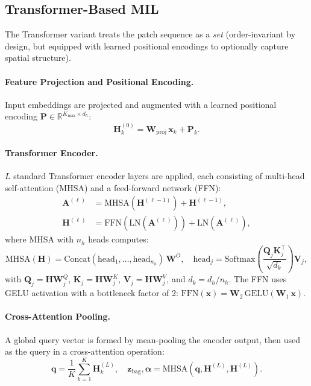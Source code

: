\documentclass[11pt,a4paper]{article}
\begin{document}
\subsection{Transformer-Based MIL}
\label{sec:transformer}

The Transformer variant treats the patch sequence as a \emph{set} (order-invariant
by design, but equipped with learned positional encodings to optionally capture
spatial structure).

\paragraph{Feature Projection and Positional Encoding.}
Input embeddings are projected and augmented with a learned positional encoding
$\mathbf{P} \in \mathbb{R}^{K_{\max} \times d_h}$:
\begin{equation}
  \mathbf{H}^{(0)}_k = \mathbf{W}_{\text{proj}}\,\mathbf{x}_k + \mathbf{P}_k.
\end{equation}

\paragraph{Transformer Encoder.}
$L$ standard Transformer encoder layers are applied, each consisting of
multi-head self-attention (MHSA) and a feed-forward network (FFN):
\begin{align}
  \mathbf{A}^{(\ell)} &= \text{MHSA}\!\left(\mathbf{H}^{(\ell-1)}\right) + \mathbf{H}^{(\ell-1)}, \\
  \mathbf{H}^{(\ell)} &= \text{FFN}\!\left(\text{LN}(\mathbf{A}^{(\ell)})\right) + \text{LN}(\mathbf{A}^{(\ell)}),
\end{align}
where MHSA with $n_h$ heads computes:
\begin{equation}
  \text{MHSA}(\mathbf{H}) = \text{Concat}(\text{head}_1, \ldots, \text{head}_{n_h})\,\mathbf{W}^O,
  \quad
  \text{head}_j = \text{Softmax}\!\left(\frac{\mathbf{Q}_j\mathbf{K}_j^\top}{\sqrt{d_k}}\right)\mathbf{V}_j,
\end{equation}
with $\mathbf{Q}_j = \mathbf{H}\mathbf{W}_j^Q$, $\mathbf{K}_j = \mathbf{H}\mathbf{W}_j^K$,
$\mathbf{V}_j = \mathbf{H}\mathbf{W}_j^V$, and $d_k = d_h / n_h$.
The FFN uses GELU activation with a bottleneck factor of 2: $\text{FFN}(\mathbf{x}) = \mathbf{W}_2\,\text{GELU}(\mathbf{W}_1\,\mathbf{x})$.

\paragraph{Cross-Attention Pooling.}
A global query vector is formed by mean-pooling the encoder output, then used as
the query in a cross-attention operation:
\begin{equation}
  \mathbf{q} = \frac{1}{K}\sum_{k=1}^{K} \mathbf{H}^{(L)}_k,
  \quad
  \mathbf{z}_{\text{bag}}, \boldsymbol{\alpha} = \text{MHSA}(\mathbf{q}, \mathbf{H}^{(L)}, \mathbf{H}^{(L)}).
\end{equation}
\end{document}
